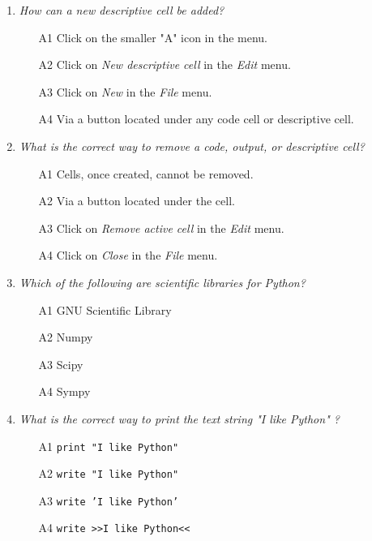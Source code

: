 \begin{enumerate}
\item {\em How can a new descriptive cell be added?}\\

\begin{enumerate}
\item[A1] Click on the smaller "A" icon in the menu.
\item[A2] Click on {\em New descriptive cell} in the {\em Edit} menu.
\item[A3] Click on {\em New} in the {\em File} menu.
\item[A4] Via a button located under any code cell or descriptive cell. 
\end{enumerate}
\vspace{4mm}

\item {\em What is the correct way to remove a code, output, or descriptive cell?}\\

\begin{enumerate}
\item[A1] Cells, once created, cannot be removed.
\item[A2] Via a button located under the cell.
\item[A3] Click on {\em Remove active cell} in the {\em Edit} menu.
\item[A4] Click on {\em Close} in the {\em File} menu.
\end{enumerate}
\vspace{4mm}

\item {\em Which of the following are scientific libraries for Python?}\\

\begin{enumerate}
\item[A1] GNU Scientific Library
\item[A2] Numpy
\item[A3] Scipy
\item[A4] Sympy
\end{enumerate}
\vspace{4mm}

\item {\em What is the correct way to print the text string "I like Python" ?}\\

\begin{enumerate}
\item[A1] {\tt print "I like Python"}
\item[A2] {\tt write "I like Python"} 
\item[A3] {\tt write 'I like Python'} 
\item[A4] {\tt write >>I like Python<<} 
\end{enumerate}
\vspace{4mm}

\end{enumerate}

